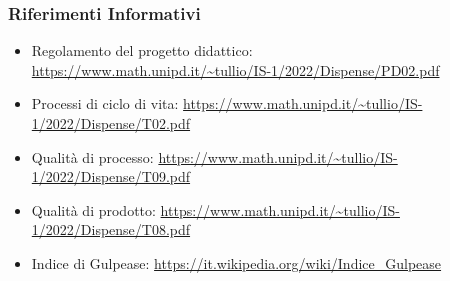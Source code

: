 \subsubsection{Riferimenti Informativi}
\begin{itemize}
    \item Regolamento del progetto didattico:\\ \url{https://www.math.unipd.it/~tullio/IS-1/2022/Dispense/PD02.pdf}
    \item Processi di ciclo di vita: \url{https://www.math.unipd.it/~tullio/IS-1/2022/Dispense/T02.pdf}
    \item Qualità di processo: \url{https://www.math.unipd.it/~tullio/IS-1/2022/Dispense/T09.pdf}
    \item Qualità di prodotto: \url{https://www.math.unipd.it/~tullio/IS-1/2022/Dispense/T08.pdf}
    \item Indice di Gulpease: \url{https://it.wikipedia.org/wiki/Indice_Gulpease}
\end{itemize}